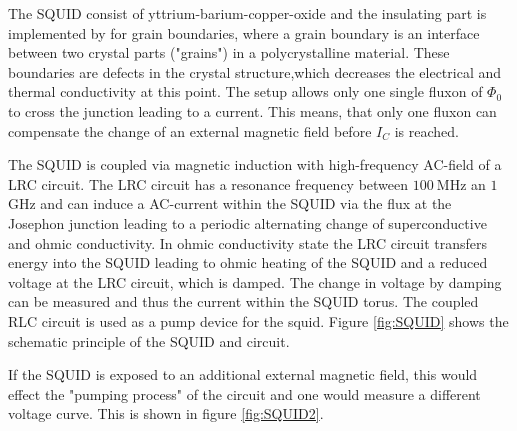 \documentclass[paper=a4, fontsize=10pt]{scrartcl}
\begin{document}
The SQUID consist of yttrium-barium-copper-oxide and the insulating
part is implemented by for grain boundaries, where a grain boundary is
an interface between two crystal parts ("grains") in a polycrystalline
material. These boundaries are defects in the crystal structure,which
decreases the electrical and thermal conductivity at this point. The
setup allows only one single fluxon of $\Phi_0$ to cross the junction
leading to a current. This means, that only one fluxon can compensate
the change of an external magnetic field before $I_C$ is reached.


The SQUID is coupled via magnetic induction with high-frequency
AC-field of a LRC circuit. The LRC circuit has a resonance frequency
between $100~$MHz an $1~$GHz and can induce a AC-current within the
SQUID via the flux at the Josephon junction leading to a periodic
alternating change of superconductive and ohmic conductivity. In ohmic
conductivity state the LRC circuit transfers energy into the SQUID
leading to ohmic heating of the SQUID and a reduced voltage at the LRC
circuit, which is damped. The change in voltage by damping can be
measured and thus the current within the SQUID torus. The coupled RLC
circuit is used as a pump device for the squid. Figure \ref{fig:SQUID}
shows the schematic principle of the SQUID and circuit.


If the SQUID is exposed to an additional external magnetic field, this
would effect the "pumping process" of the circuit and one would
measure a different voltage curve. This is shown in figure
\ref{fig:SQUID2}.
\end{document}

